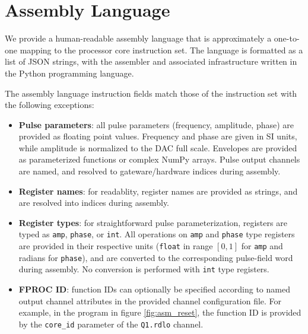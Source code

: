 \documentclass[journal]{IEEEtran}
\begin{document}


\section{Assembly Language}

We provide a human-readable assembly language that is approximately a one-to-one mapping to the processor core instruction set. The language is formatted as a list of JSON \cite{crockford2017standard} strings, with the assembler and associated infrastructure written in the Python programming language. 

The assembly language instruction fields match those of the instruction set with the following exceptions:
\begin{itemize}
    \item \textbf{Pulse parameters}: all pulse parameters (frequency, amplitude, phase) are provided as floating point values. Frequency and phase are given in SI units, while amplitude is normalized to the DAC full scale. Envelopes are provided as parameterized functions or complex NumPy arrays. Pulse output channels are named, and resolved to gateware/hardware indices during assembly.
    \item \textbf{Register names}: for readablity, register names are provided as strings, and are resolved into indices during assembly. 
    \item \textbf{Register types}: for straightforward pulse parameterization, registers are typed as \verb|amp|, \verb|phase|, or \verb|int|. All operations on \verb|amp| and \verb|phase| type registers are provided in their respective units (\verb|float| in range $[0, 1]$ for \verb|amp| and radians for \verb|phase|), and are converted to the corresponding pulse-field word during assembly. No conversion is performed with \verb|int| type registers.
    \item \textbf{FPROC ID}: function IDs can optionally be specified according to named output channel attributes in the provided channel configuration file. For example, in the program in figure \ref{fig:asm_reset}, the function ID is provided by the \verb|core_id| parameter of the \verb|Q1.rdlo| channel.
\end{itemize}
\end{document}
